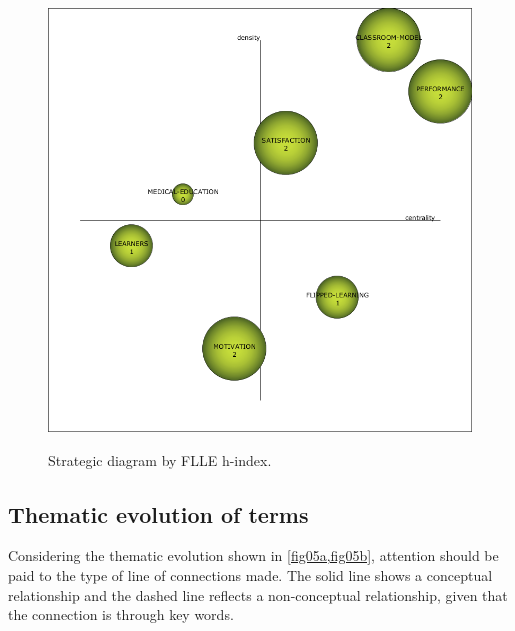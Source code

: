 \documentclass{textolivre}
\begin{document}
\begin{figure}[htbp]
\begin{minipage}{.45\textwidth}
 \label{fig04d}
 \end{minipage}
 \par\vspace{2ex}
 \begin{minipage}{.45\textwidth}
 \includegraphics[width=\textwidth]{Fig04e.png}
 \label{fig04e}
 \end{minipage}
 \hfill
 \begin{minipage}{.45\textwidth}
 \hfill
 \end{minipage}
\caption{Strategic diagram by FLLE h-index.}
\label{fig04}
\end{figure}



\subsection{Thematic evolution of terms}\label{sec-thematic}
Considering the thematic evolution shown in \cref{fig05a,fig05b}, attention should be paid to the type of line of connections made. The solid line shows a conceptual relationship and the dashed line reflects a non-conceptual relationship, given that the connection is through key words.
\end{document}
